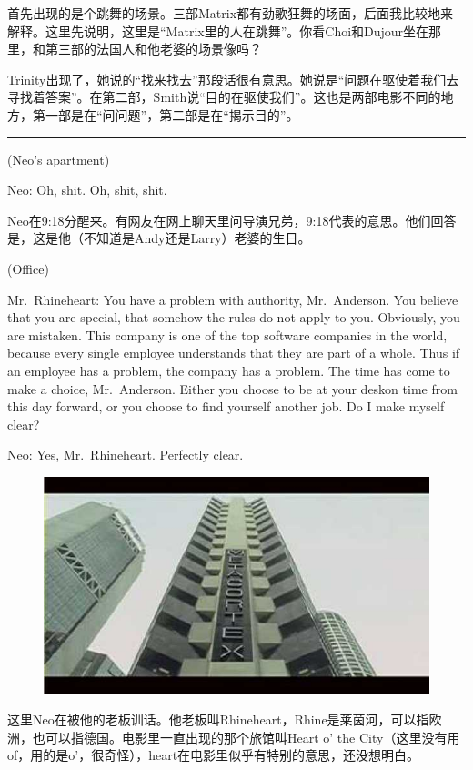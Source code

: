 \documentclass{ctexart}
\newcommand{\myparsep}{\noindent \rule[0.5ex]{\linewidth}{1pt}}
\newenvironment{myquote}{\color{green} \setlength{\leftskip}{6em} \setlength{\rightskip}{4em} \setlength{\parindent}{-2em}}{\par}
\begin{document}
首先出现的是个跳舞的场景。三部Matrix都有劲歌狂舞的场面，后面我比较地来解释。这里先说明，这里是“Matrix里的人在跳舞”。你看Choi和Dujour坐在那里，和第三部的法国人和他老婆的场景像吗？

Trinity出现了，她说的“找来找去”那段话很有意思。她说是“问题在驱使着我们去寻找着答案”。在第二部，Smith说“目的在驱使我们”。这也是两部电影不同的地方，第一部是在“问问题”，第二部是在“揭示目的”。

\myparsep

\begin{myquote}
(Neo's apartment)

Neo: Oh, shit. Oh, shit, shit.
\end{myquote}

Neo在9:18分醒来。有网友在网上聊天里问导演兄弟，9:18代表的意思。他们回答是，这是他（不知道是Andy还是Larry）老婆的生日。

\begin{myquote}
(Office)

Mr.~Rhineheart: You have a problem with authority, Mr.~Anderson. You believe that you are special, that somehow the rules do not apply to you. Obviously, you are mistaken. This company is one of the top software companies in the world, because every single employee understands that they are part of a whole. Thus if an employee has a problem, the company has a problem. The time has come to make a choice, Mr.~Anderson. Either you choose to be at your deskon time from this day forward, or you choose to find yourself another job. Do I make myself clear?

Neo: Yes, Mr.~Rhineheart. Perfectly clear.
\end{myquote}

\begin{figure}[htb]
\centering
\includegraphics[width=0.5\linewidth]{fig/read_Matrix-6}
\end{figure}

这里Neo在被他的老板训话。他老板叫Rhineheart，Rhine是莱茵河，可以指欧洲，也可以指德国。电影里一直出现的那个旅馆叫Heart o' the City（这里没有用of，用的是o'，很奇怪），heart在电影里似乎有特别的意思，还没想明白。
\end{document}
